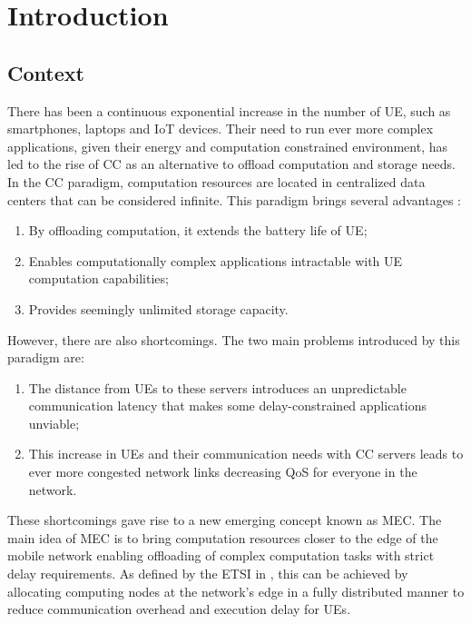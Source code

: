 \chapter{Introduction}
\label{chapter:introduction}
\setcounter{page}{1}
\section{Context}
\noindent There has been a continuous exponential increase in the number of \acrfull{UE}, such as smartphones, laptops and \acrfull{IoT} devices. Their need to run ever more complex applications, given their energy and computation constrained environment, has led to the rise of \acrfull{CC} as an alternative to offload computation and storage needs. In the \acrshort{CC} paradigm, computation resources are located in centralized data centers that can be considered infinite. This paradigm brings several advantages \cite{SHAKARAMI2020107496}: 
\begin{enumerate}
    \item By offloading computation, it extends the battery life of \acrshort{UE}; 
    \item Enables computationally complex applications intractable with \acrshort{UE} computation capabilities;
    \item Provides seemingly unlimited storage capacity.
\end{enumerate}
However, there are also shortcomings. The two main problems introduced by this paradigm are: 
\begin{enumerate}
    \item The distance from \acrshort{UE}s to these servers introduces an unpredictable communication latency that makes some delay-constrained applications unviable;
    \item  This increase in \acrshort{UE}s and their communication needs with \acrshort{CC} servers leads to ever more congested network links decreasing \acrfull{QoS} for everyone in the network.
\end{enumerate}

\par
These shortcomings gave rise to a new emerging concept known as \acrfull{MEC}. The main idea of \acrshort{MEC} is to bring computation resources closer to the edge of the mobile network enabling offloading of complex computation tasks with strict delay requirements. As defined by the \acrfull{ETSI} in \cite{MECspec}, this can be achieved by allocating computing nodes at the network's edge in a fully distributed manner to reduce communication overhead and execution delay for \acrshort{UE}s.

